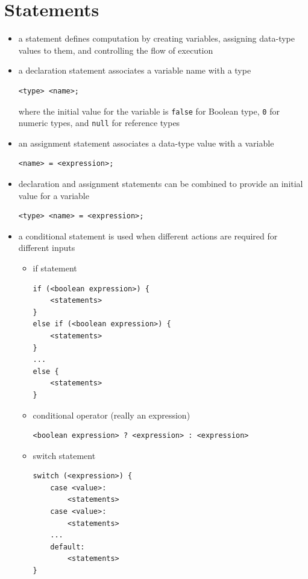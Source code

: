 \documentclass[8pt,a4paper,compress]{beamer}
\begin{document}
\section{Statements}
\begin{frame}[fragile]
\begin{itemize}
\item a statement defines computation by creating variables, assigning data-type values to them, and controlling the flow of execution

\item a declaration statement associates a variable name with a type
\begin{lstlisting}[language={}]
<type> <name>;
\end{lstlisting}
where the initial value for the variable is \lstinline{false} for Boolean type, \lstinline{0} for numeric types, and \lstinline{null} for reference types

\item an assignment statement associates a data-type value with a variable
\begin{lstlisting}[language={}]
<name> = <expression>;
\end{lstlisting}

\item declaration and assignment statements can be combined to provide an initial value for a variable
\begin{lstlisting}[language={}]
<type> <name> = <expression>;
\end{lstlisting}
\end{itemize}
\end{frame}

\begin{frame}[fragile]
\begin{itemize}
\item a conditional statement is used when different actions are required for different inputs

\begin{itemize}
\item if statement
\begin{lstlisting}[language={}]
if (<boolean expression>) {
    <statements>
}
else if (<boolean expression>) {
    <statements>
}
...
else {
    <statements>
}
\end{lstlisting}

\item conditional operator (really an expression)
\begin{lstlisting}[language={}]
<boolean expression> ? <expression> : <expression>
\end{lstlisting}

\item switch statement 
\begin{lstlisting}[language={}]
switch (<expression>) {
    case <value>:
        <statements>
    case <value>:
        <statements>
    ...
    default:
        <statements>
}
\end{lstlisting}

\end{itemize}
 
\end{itemize}
\end{frame}
\end{document}
